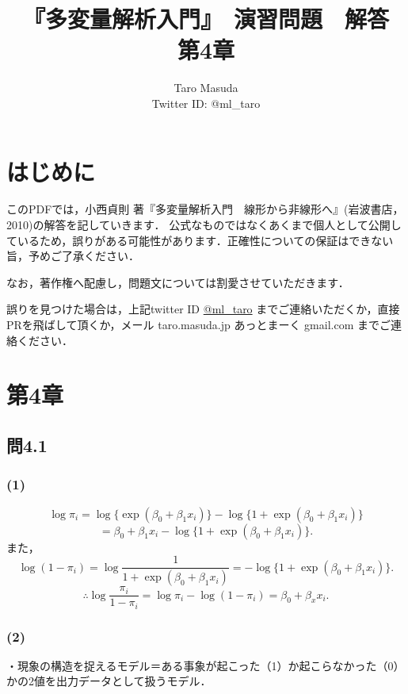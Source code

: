 \documentclass[pdflatex,ja=standard]{bxjsarticle}
\title{『多変量解析入門』　演習問題　解答　第4章}
\author{Taro Masuda \\ Twitter ID: @ml\_taro}
\begin{document}
\maketitle

\section*{はじめに}
このPDFでは，小西貞則 著『多変量解析入門　線形から非線形へ』(岩波書店，2010)の解答を記していきます．
公式なものではなくあくまで個人として公開しているため，誤りがある可能性があります．正確性についての保証はできない旨，予めご了承ください．

なお，著作権へ配慮し，問題文については割愛させていただきます．

誤りを見つけた場合は，上記twitter ID \href{https://twitter.com/ml_taro}{@ml\_taro} までご連絡いただくか，直接PRを飛ばして頂くか，メール taro.masuda.jp あっとまーく gmail.com までご連絡ください．

\section*{第4章}

\subsection*{問4.1}
\subsubsection*{(1)}
\begin{equation}
    \log \pi_i = \log \{ \exp (\beta_0 + \beta_1 x_i) \} - \log \{ 1 + \exp (\beta_0 + \beta_1 x_i) \}
\end{equation}
\begin{equation}
    = \beta_0 + \beta_1 x_i - \log  \{1 + \exp (\beta_0 + \beta_1 x_i)  \}.
\end{equation}
また，
\begin{equation}
    \log (1 - \pi_i)  = \log \frac{1}{1 + \exp (\beta_0 + \beta_1 x_i)} = - \log \{1 + \exp (\beta_0 + \beta_1 x_i)  \}.
\end{equation}
\begin{equation}
    \therefore \log \frac{\pi_i}{1 - \pi_i} = \log \pi_i - \log (1 - \pi_i) = \beta_0 + \beta_x x_i.
\end{equation}

\subsubsection*{(2)}
・現象の構造を捉えるモデル＝ある事象が起こった（1）か起こらなかった（0）かの2値を出力データとして扱うモデル．
\end{document}
